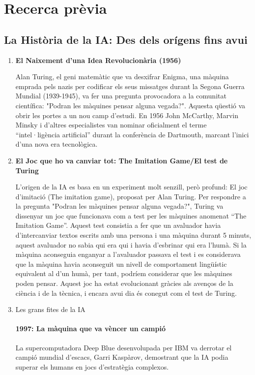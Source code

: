 \chapter{Recerca prèvia}
\label{c:recerca prèvia}
\section{La Història de la IA: Des dels orígens fins avui}
\begin{enumerate}
     \item \textbf{El Naixement d'una Idea Revolucionària (1956)}

             Alan Turing, el geni matemàtic que va desxifrar Enigma, una màquina emprada pels nazis per codificar els seus missatges durant la Segona Guerra Mundial (1939-1945), va fer una pregunta provocadora a la comunitat científica: "Podran les màquines pensar alguna vegada?". Aquesta qüestió va obrir les portes a un nou camp d’estudi. En 1956 John McCarthy, Marvin Minsky i d'altres especialistes van nominar oficialment el terme ``intel·ligència artificial'' durant la conferència de Dartmouth, marcant l'inici d'una nova era tecnològica.

      \item \textbf{El Joc que ho va canviar tot: The Imitation Game/El test de Turing}

            L'origen de la IA es basa en un experiment molt senzill, però profund: El joc d'imitació (The imitation game), proposat per Alan Turing. Per respondre a la pregunta "Podran les màquines pensar alguna vegada?", Turing va dissenyar un joc que funcionava com a test per les màquines anomenat ``The Imitation Game''. Aquest test consistia a fer que un avaluador havia d'intercanviar textos escrits amb una persona i una màquina durant 5 minuts, aquest avaluador no sabia qui era qui i havia d'esbrinar qui era l'humà. Si la màquina aconseguia enganyar a l'avaluador passava el test i es considerava que la màquina havia aconseguit un nivell de comportament lingüístic equivalent al d'un humà, per tant, podríem considerar que les màquines poden pensar. Aquest joc ha estat evolucionant gràcies als avenços de la ciència i de la tècnica, i encara avui dia és conegut com el test de Turing.

     \item Les grans fites de la IA
        \subsubsection{1997: La màquina que va vèncer un campió}
            La supercomputadora Deep Blue desenvolupada per IBM va derrotar el campió mundial d’escacs, Garri Kaspàrov, demostrant que la IA podia superar els humans en jocs d’estratègia complexos.

\end{enumerate}
